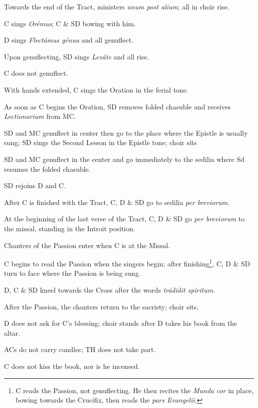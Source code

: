 {    \rubric Towards the end of the Tract, ministers \textit{unum post alium};
    all in choir rise.

    \rubric C sings \textit{Orémus}; C \& SD bowing with him.

    \rubric D sings \textit{Flectámus génua} and all genuflect.

    \rubric Upon genuflecting, SD sings \textit{Leváte} and all rise.

    \rubric C does not genuflect.

    \rubric With hands extended, C sings the Oration in the ferial tone.

    \rubric As soon as C begins the Oration, SD removes folded chasuble and
    receives \textit{Lectionarium} from MC.

    \rubric SD and MC genuflect in center then go to the place where the
    Epistle is usually sung; SD sings the Second Lesson in the Epistle tone;
    choir sits

    \rubric SD and MC genuflect in the center and go immediately to the sedilia
    where Sd resumes the folded chasuble.

    \rubric SD rejoins D and C.

    \rubric After C is finished with the Tract, C, D \& SD go to sedilia
    \textit{per breviorum.}

    \rubric At the beginning of the last verse of the Tract, C, D \& SD go
    \textit{per breviorum} to the missal, standing in the Introit position.

    \rubric Chanters of the Passion enter when C is at the Missal.

    \rubric C begins to read the Passion when the singers begin; after
    finishing\footnote{C reads the Passion, not genuflecting. He then recites
    the \textit{Munda cor} in place, bowing towards the Crucifix, then reads
    the \textit{pars Evangelii}.}, C, D \& SD turn to face where the Passion is
    being sung.

    \rubric D, C \& SD kneel towards the Cross after the words \textit{trádidit
    spíritum.}

    \rubric After the Passion, the chanters return to the sacristy; choir sits.

    \rubric D does not ask for C's blessing; choir stands after D takes his
    book from the altar.

    \rubric ACs do not carry candles; TH does not take part.

    \rubric C does not kiss the book, nor is he incensed.

}
